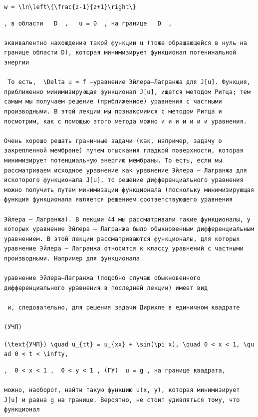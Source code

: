 \documentclass[
  ukrainian,
]{article}
\begin{document}
\texttt{w\ =\ \textbackslash{}ln\textbackslash{}left\textbackslash{}\{\textbackslash{}frac\{z-1\}\{z+1\}\textbackslash{}right\textbackslash{}\}}

\begin{verbatim}
, в области   D  ,   u = 0  , на границе   D  ,

эквивалентно нахождению такой функции u (тоже обращающейся в нуль на границе области D), которая минимизирует функционал потенинальной энергии

 То есть,  \Delta u = f —уравнение Эйлера—Лагранжа для J[u]. Функция, приближенно минимизирующая функционал J[u], ищется методом Ритца; тем самым мы получаем решение (приближениое) уравнения с частными производными. В этой лекции мы познакомимся с методом Ритца и посмотрим, как с помощью этого метода можно и и и и и и и уравнения.

Очень хорошо решать граничные задачи (как, например, задачу о закрепленной мембране) путем отыскания гладкой поверхности, которая минимизирует потенциальную энергию мембраны. То есть, если мы рассматриваем исходное уравнение как уравнение Эйлера — Лагранжа для искоторого функционала J[u], то решение дифференциального уравнения можно получить путем минимизации функционала (поскольку минимизирующая функция функционала является решением соответствующего уравнения

Эйлера — Лагранжа). В лекции 44 мы рассматривали такие функционалы, у которых уравнение Эйлера — Лагранжа было обыкновенным дифференциальным уравнением. В этой лекции рассматриваются функционалы, для которых уравнение Эйлера — Лагранжа относится к классу уравнений с частными производными. Например для функционала

уравнение Эйлера—Лагранжа (подобно случаю обыкновенного дифференциального уравнения в последней лекции) имеет вид

 и, следовательно, для решения задачи Дирихле в единичном квадрате

(УЧП)
\end{verbatim}

\texttt{(\textbackslash{}text\{УЧП\})\ \textbackslash{}quad\ u\_\{tt\}\ =\ u\_\{xx\}\ +\ \textbackslash{}sin(\textbackslash{}pi\ x),\ \textbackslash{}quad\ 0\ \textless{}\ x\ \textless{}\ 1,\ \textbackslash{}quad\ 0\ \textless{}\ t\ \textless{}\ \textbackslash{}infty,}

\begin{verbatim}
,  0 < x < 1 ,  0 < y < 1 , (ГУ)  u = g , на границе квадрата,

можно, наоборот, найти такую функцию u(x, y), которая минимизирует J[u] и равна g на границе. Вероятно, не стоит удивляться тому, что функционал
\end{verbatim}
\end{document}

